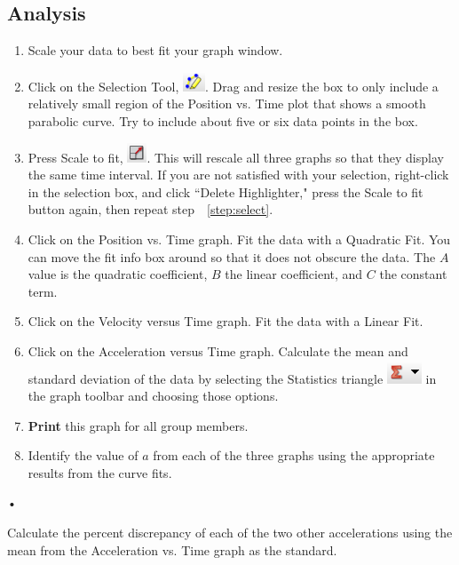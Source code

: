 \documentclass[main.tex]{subfiles}
\begin{document}
\subsection*{Analysis}
\begin{enumerate}
\item
Scale your data to best fit your graph window.
\item \label{step:select}
Click on the Selection Tool, \includegraphics{Selection_Tool}. Drag and resize the box to only include a relatively small region of the Position vs. Time plot that shows a smooth parabolic curve. Try to include about five or six data points in the box.
\item
Press Scale to fit, \includegraphics{Rescale}. This will rescale all three graphs so that they display the same time interval. If you are not satisfied with your selection, right-click in the selection box, and click ``Delete Highlighter," press the Scale to fit button again, then repeat step~~\ref{step:select}.
\item
Click on the Position vs. Time graph. Fit the data with a Quadratic Fit. You can move the fit info box around so that it does not obscure the data. The $A$ value is the quadratic coefficient, $B$ the linear coefficient, and $C$ the constant term.
\item
Click on the Velocity versus Time graph. Fit the data with a Linear Fit.
\item
Click on the Acceleration versus Time graph. Calculate the mean and standard deviation of the data by selecting the Statistics triangle \includegraphics{Statistics} in the graph toolbar and choosing those options.
\item
\textbf{Print} this graph for all group members.
\item
Identify the value of $a$ from each of the three graphs using the appropriate results from the curve fits.
\end{enumerate}•

\begin{question}
Calculate the percent discrepancy of each of the two other accelerations using the mean from the Acceleration vs. Time graph as the standard. 
\end{question}
\end{document}

